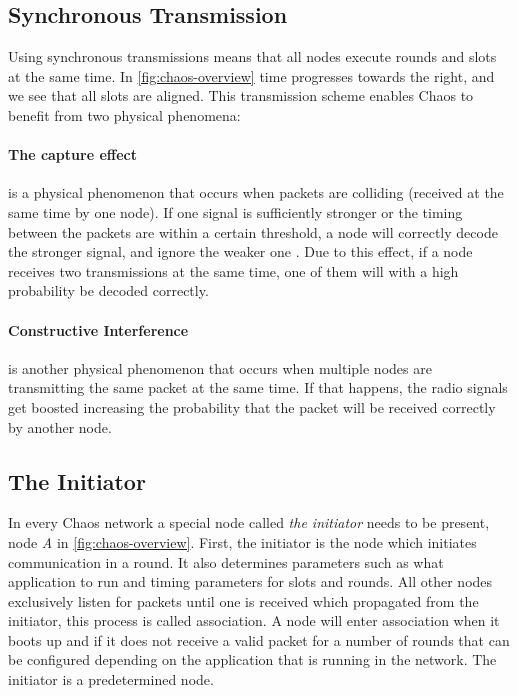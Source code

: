 \subsection{Synchronous Transmission}
Using synchronous transmissions means that all nodes execute rounds and slots at the same time. In \cref{fig:chaos-overview} time progresses towards the right, and we see that all slots are aligned. This transmission scheme enables Chaos to benefit from two physical phenomena:

\paragraph*{The capture effect} is a physical phenomenon that occurs when packets are colliding (received at the same time by one node). If one signal is sufficiently stronger or the timing between the packets are within a certain threshold, a node will correctly decode the stronger signal, and ignore the weaker one \cite{Lee2007-capture-effect}. Due to this effect, if a node receives two transmissions at the same time, one of them will with a high probability be decoded correctly.

\paragraph*{Constructive Interference} is another physical phenomenon that occurs when multiple nodes are transmitting the same packet at the same time. If that happens, the radio signals get boosted increasing the probability that the packet will be received correctly by another node.

\subsection{The Initiator}
In every Chaos network a special node called \emph{the initiator} needs to be present, node \textit{A} in \cref{fig:chaos-overview}. First, the initiator is the node which initiates communication in a round. It also determines parameters such as what application to run and timing parameters for slots and rounds. All other nodes exclusively listen for packets until one is received which propagated from the initiator, this process is called association. A node will enter association when it boots up and if it does not receive a valid packet for a number of rounds that can be configured depending on the application that is running in the network. The initiator is a predetermined node.

